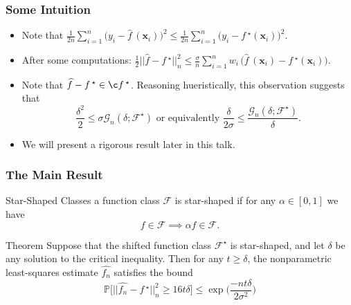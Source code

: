 \documentclass[11pt]{beamer}
\newcommand{\Prob}{\mathbb{P}}
\newcommand{\bx}{\mathbf{x}}
\newcommand{\cF}{\mathcal{F}}
\newcommand{\cG}{\mathcal{G}}
\newcommand{\fstar}{f\,^\star}
\newcommand{\fhat}{\widehat{f}}
\begin{document}
		\begin{frame}
			\frametitle{Some Intuition}
			\begin{itemize}
				\item Note that $\frac{1}{2n} \sum_{i = 1}^{n} \big(y_i - \widehat f\, (\bx_i)\big)^2 \leq \frac{1}{2n}\sum_{i = 1}^{n} \big(y_i - \fstar(\bx_i)\big)^2$.
				\vspace{0.2cm}
				
				\item 					
				After some computations: $\frac{1}{2} ||\fhat - \fstar||_n^2 \leq \frac{\sigma}{n} \sum_{i = 1}^{n} w_i\,\big(\fhat\,(\bx_i) - \fstar(\bx_i)\big)$.
				\vspace{0.2cm}
				
				\item  Note that $\fhat - \fstar \in \c\fstar$.  Reasoning hueristically, this observation suggests that 				
				\begin{equation*}
					\frac{\delta^2}{2} \leq \sigma \cG_n(\delta; \mathcal{F}^\star) \text{ or equivalently } \frac{\delta}{2\sigma} \leq \frac{\cG_n(\delta; \cF^\star)}{\delta}.
				\end{equation*}	
				
				\item We will present a rigorous result later in this talk.
			\end{itemize}			 
		\end{frame}
		
			
		
		\begin{frame}
			\frametitle{The Main Result}
			
				\begin{block}{Star-Shaped Classes}
				a function class $\cF$ is star-shaped if for any $\alpha \in [0,1]$ we have
				\begin{equation*}
				f \in \cF \implies \alpha f \in \cF.
				\end{equation*}
			\end{block}
			
			\begin{block}{Theorem}
				Suppose that the shifted function class $\cF^\star$ is star-shaped, and let $\delta$ be any solution to the critical inequality. Then for any $t \geq \delta$, the nonparametric least-squares estimate $\widehat{f_n}$ satisfies the bound
				\begin{equation}
					\Prob\big[||\widehat{f_n} - \fstar ||_n^2 \geq 16t\delta\big] \leq \exp\Big(\frac{-nt\delta}{2\sigma^2}\Big)
				\end{equation}
			\end{block}
		\end{frame}
\end{document}
